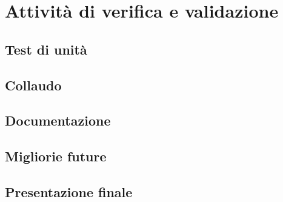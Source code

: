 \chapter{Attività di verifica e validazione}
\label{cap:verifica-validazione}

\section{Test di unità}
\section{Collaudo}
\section{Documentazione}
\section{Migliorie future}
\section{Presentazione finale}








